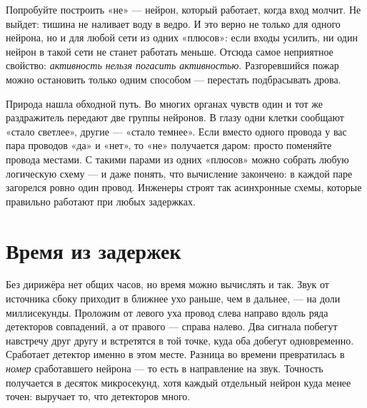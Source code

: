 Попробуйте построить «не» --- нейрон, который работает, когда вход молчит. Не выйдет: тишина не наливает воду в ведро. И это верно не только для одного нейрона, но и для любой сети из одних «плюсов»: если входы усилить, ни один нейрон в такой сети не станет работать меньше. Отсюда самое неприятное свойство: \emph{активность нельзя погасить активностью}. Разгоревшийся пожар можно остановить только одним способом --- перестать подбрасывать дрова.

Природа нашла обходной путь. Во многих органах чувств один и тот же раздражитель передают две группы нейронов. В глазу одни клетки сообщают «стало светлее», другие --- «стало темнее». Если вместо одного провода у вас пара проводов «да» и «нет», то «не» получается даром: просто поменяйте провода местами. С такими парами из одних «плюсов» можно собрать любую логическую схему --- и даже понять, что вычисление закончено: в каждой паре загорелся ровно один провод. Инженеры строят так асинхронные схемы, которые правильно работают при любых задержках.

\section*{Время из задержек}

Без дирижёра нет общих часов, но время можно вычислять и так. Звук от источника сбоку приходит в ближнее ухо раньше, чем в дальнее, --- на доли миллисекунды. Проложим от левого уха провод слева направо вдоль ряда детекторов совпадений, а от правого --- справа налево. Два сигнала побегут навстречу друг другу и встретятся в той точке, куда оба добегут одновременно. Сработает детектор именно в этом месте. Разница во времени превратилась в \emph{номер} сработавшего нейрона --- то есть в направление на звук. Точность получается в десяток микросекунд, хотя каждый отдельный нейрон куда менее точен: выручает то, что детекторов много.


